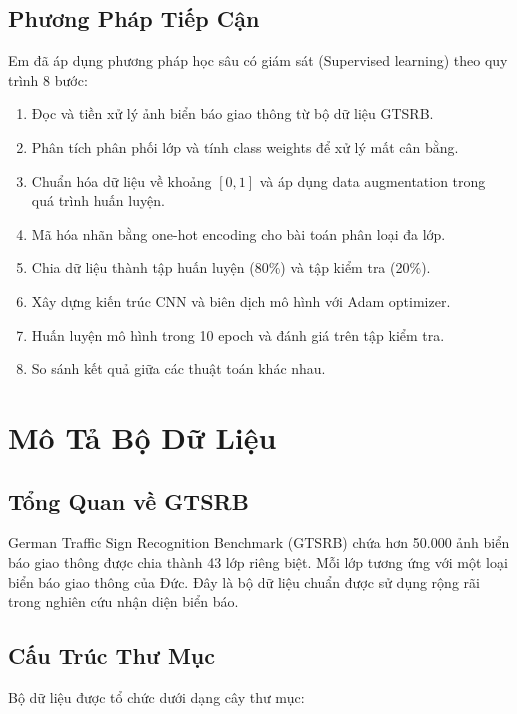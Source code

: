 \documentclass[12pt,a4paper]{article}
\begin{document}
\subsection{Phương Pháp Tiếp Cận}
Em đã áp dụng phương pháp học sâu có giám sát (Supervised learning) theo quy trình 8 bước:

\begin{enumerate}[label=\textbf{Bước \arabic*:},leftmargin=*]
    \item Đọc và tiền xử lý ảnh biển báo giao thông từ bộ dữ liệu GTSRB.
    \item Phân tích phân phối lớp và tính class weights để xử lý mất cân bằng.
    \item Chuẩn hóa dữ liệu về khoảng $[0, 1]$ và áp dụng data augmentation trong quá trình huấn luyện.
    \item Mã hóa nhãn bằng one-hot encoding cho bài toán phân loại đa lớp.
    \item Chia dữ liệu thành tập huấn luyện (80\%) và tập kiểm tra (20\%).
    \item Xây dựng kiến trúc CNN và biên dịch mô hình với Adam optimizer.
    \item Huấn luyện mô hình trong 10 epoch và đánh giá trên tập kiểm tra.
    \item So sánh kết quả giữa các thuật toán khác nhau.
\end{enumerate}

\section{Mô Tả Bộ Dữ Liệu}

\subsection{Tổng Quan về GTSRB}
German Traffic Sign Recognition Benchmark (GTSRB) chứa hơn 50.000 ảnh biển báo giao thông được chia thành 43 lớp riêng biệt. Mỗi lớp tương ứng với một loại biển báo giao thông của Đức. Đây là bộ dữ liệu chuẩn được sử dụng rộng rãi trong nghiên cứu nhận diện biển báo.

\subsection{Cấu Trúc Thư Mục}
Bộ dữ liệu được tổ chức dưới dạng cây thư mục:
\end{document}
